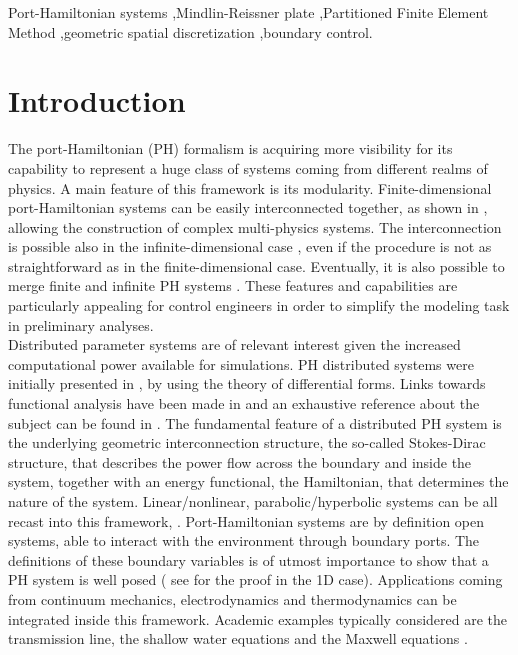 \documentclass[preprint,12pt]{elsarticle}
\begin{document}
\begin{frontmatter}
		\begin{keyword}
			Port-Hamiltonian systems \sep Mindlin-Reissner plate \sep Partitioned Finite Element Method \sep geometric spatial discretization \sep boundary control.		
		\end{keyword}
		
	\end{frontmatter}
	
	
	\section*{Introduction}
	The port-Hamiltonian (PH) formalism is acquiring more visibility for its capability to represent a huge class of systems coming from different realms of physics. A main feature of this framework is its modularity. Finite-dimensional port-Hamiltonian systems can be easily interconnected together, as shown in \cite{Cervera2007}, allowing the construction of complex multi-physics systems. The interconnection is possible also in the infinite-dimensional case \cite{ShaftIntInfinite}, even if the procedure is not as straightforward as in the finite-dimensional case. Eventually, it is also possible to merge finite and infinite PH systems \cite{vanderShaftintFinInf}. These features and capabilities are particularly appealing for control engineers in order to simplify the modeling task in preliminary analyses. \\
	
	
	Distributed parameter systems are of relevant interest given the increased computational power available for simulations. PH distributed systems were initially presented in \cite{VANDERSCHAFT2002166}, by using the theory of differential forms. Links towards functional analysis have been made in \cite{Villegas} and an exhaustive reference about the subject can be found in \cite{BookZwart}. The fundamental feature of a distributed PH system is the underlying geometric interconnection structure, the so-called Stokes-Dirac structure, that describes the power flow across the boundary and inside the system, together with an energy functional, the Hamiltonian, that determines the nature of the system. Linear/nonlinear, parabolic/hyperbolic systems can be all recast into this framework, \cite{bookPHs}. Port-Hamiltonian systems are by definition open systems, able to interact with the environment through boundary ports. The definitions of these boundary variables is of utmost importance to show that a PH system is well posed ( see \cite{LeGorrec2005} for the proof in the 1D case). Applications coming from continuum mechanics, electrodynamics and thermodynamics can be integrated inside this framework. Academic examples typically considered are the transmission line, the shallow water equations and the Maxwell equations \cite{PHbookShaft}. \\
	
\end{document}
